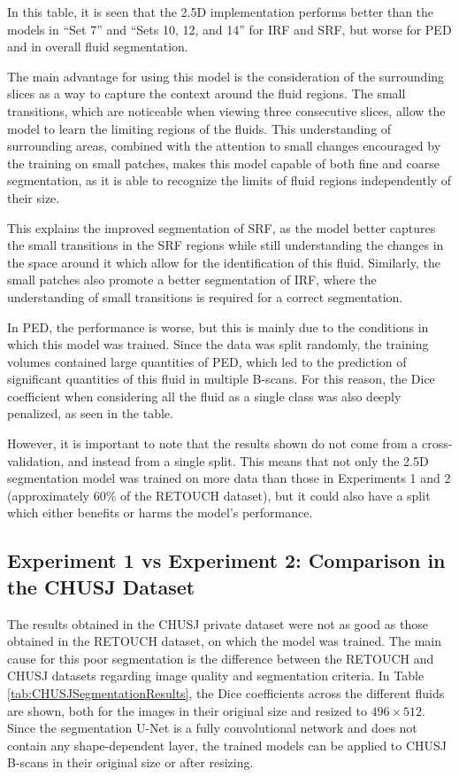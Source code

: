 In this table, it is seen that the 2.5D implementation performs better than the models in ``Set 7'' and ``Sets 10, 12, and 14'' for IRF and SRF, but worse for PED and in overall fluid segmentation.
\par
The main advantage for using this model is the consideration of the surrounding slices as a way to capture the context around the fluid regions. The small transitions, which are noticeable when viewing three consecutive slices, allow the model to learn the limiting regions of the fluids. This understanding of surrounding areas, combined with the attention to small changes encouraged by the training on small patches, makes this model capable of both fine and coarse segmentation, as it is able to recognize the limits of fluid regions independently of their size. 
\par
This explains the improved segmentation of SRF, as the model better captures the small transitions in the SRF regions while still understanding the changes in the space around it which allow for the identification of this fluid. Similarly, the small patches also promote a better segmentation of IRF, where the understanding of small transitions is required for a correct segmentation.
\par
In PED, the performance is worse, but this is mainly due to the conditions in which this model was trained. Since the data was split randomly, the training volumes contained large quantities of PED, which led to the prediction of significant quantities of this fluid in multiple B-scans. For this reason, the Dice coefficient when considering all the fluid as a single class was also deeply penalized, as seen in the table. 
\par
However, it is important to note that the results shown do not come from a cross-validation, and instead from a single split. This means that not only the 2.5D segmentation model was trained on more data than those in Experiments 1 and 2 (approximately 60\% of the RETOUCH dataset), but it could also have a split which either benefits or harms the model's performance.

\subsection{Experiment 1 vs Experiment 2: Comparison in the CHUSJ Dataset}

The results obtained in the CHUSJ private dataset were not as good as those obtained in the \hbox{RETOUCH} dataset, on which the model was trained. The main cause for this poor segmentation is the difference between the RETOUCH and CHUSJ datasets regarding image quality and segmentation criteria. In Table \ref{tab:CHUSJSegmentationResults}, the Dice coefficients across the different fluids are shown, both for the images in their original size and resized to $496 \times 512$. Since the segmentation U-Net is a fully convolutional network and does not contain any shape-dependent layer, the trained models can be applied to CHUSJ B-scans in their original size or after resizing.

